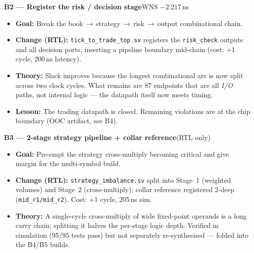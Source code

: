 \documentclass[10pt,a4paper]{article}
\begin{document}
{\bfseries\color{accentteal} B2 — Register the risk / decision stage}\quad WNS $-2.217$\,ns
\begin{itemize}[leftmargin=1.2em, itemsep=1pt, topsep=2pt]
  \item \textbf{Goal:} Break the book\,$\to$\,strategy\,$\to$\,risk\,$\to$\,output
        combinational chain.
  \item \textbf{Change (RTL):} \texttt{tick\_to\_trade\_top.sv} registers the
        \texttt{risk\_check} outputs and all decision ports, inserting a pipeline
        boundary mid-chain (cost: +1 cycle, 200\,ns latency).
  \item \textbf{Theory:} Slack improves because the longest combinational arc is
        now split across two clock cycles. What remains are 87 endpoints that are
        all \emph{I/O} paths, not internal logic — the datapath itself now meets
        timing.
  \item \textbf{Lesson:} The trading datapath is closed. Remaining violations are
        at the chip boundary (OOC artifact, see B4).
\end{itemize}

{\bfseries\color{accentteal} B3 — 2-stage strategy pipeline + collar reference}\quad(RTL only)
\begin{itemize}[leftmargin=1.2em, itemsep=1pt, topsep=2pt]
  \item \textbf{Goal:} Pre-empt the strategy cross-multiply becoming critical and
        give margin for the multi-symbol build.
  \item \textbf{Change (RTL):} \texttt{strategy\_imbalance.sv} split into Stage~1
        (weighted volumes) and Stage~2 (cross-multiply); collar reference
        registered 2-deep (\texttt{mid\_r1/mid\_r2}). Cost: +1 cycle, 205\,ns sim.
  \item \textbf{Theory:} A single-cycle cross-multiply of wide fixed-point
        operands is a long carry chain; splitting it halves the per-stage logic
        depth. Verified in simulation (95/95 tests pass) but not separately
        re-synthesised — folded into the B4/B5 builds.
\end{itemize}
\end{document}
